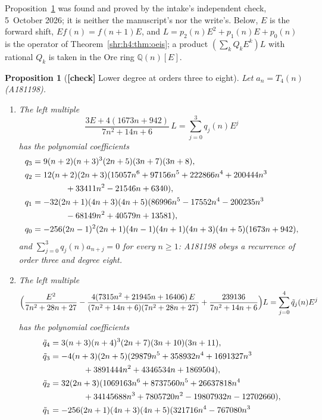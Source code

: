\documentclass[11pt,letterpaper]{article}
\numberwithin{equation}{section}
\newtheorem{proposition}[theorem]{Proposition}
\theoremstyle{definition}
\newcommand{\Q}{\mathbb Q}
\newcommand{\1}{\mathbf 1}
\begin{document}
Proposition~\ref{shr:h4:prop:higher} was found and proved by the intake's
independent check, 5~October 2026; it is neither the manuscript's nor the
write's. Below, $E$ is the forward shift, $Ef(n)=f(n+1)E$, and
$L=p_2(n)E^2+p_1(n)E+p_0(n)$ is the operator of
Theorem~\ref{shr:h4:thm:oeis}; a product $(\sum_kQ_kE^k)L$ with rational
$Q_k$ is taken in the Ore ring $\Q(n)[E]$.

\begin{proposition}[\textbf{[check]} Lower degree at orders three to eight]
\label{shr:h4:prop:higher}
Let $a_n=T_4(n)$ (A181198).
\begin{enumerate}[label=(\alph*),leftmargin=*]
\item The left multiple
\[
 \frac{3E+4(1673n+942)}{7n^2+14n+6}\,L=\sum_{j=0}^{3}q_j(n)E^j
\]
has the polynomial coefficients
\begin{align*}
 q_3&=9(n+2)(n+3)^3(2n+5)(3n+7)(3n+8),\\
 q_2&=12(n+2)(2n+3)(15057n^6+97156n^5+222866n^4+200444n^3\\
    &\hspace{14mm}+33411n^2-21546n+6340),\\
 q_1&=-32(2n+1)(4n+3)(4n+5)(86996n^5-17552n^4-200235n^3\\
    &\hspace{14mm}-68149n^2+40579n+13581),\\
 q_0&=-256(2n-1)^2(2n+1)(4n-1)(4n+1)(4n+3)(4n+5)(1673n+942),
\end{align*}
and $\sum_{j=0}^3q_j(n)a_{n+j}=0$ for every $n\ge1$: A181198 obeys a
recurrence of order three and degree eight.
\item The left multiple
\[
 \Bigl(\frac{E^2}{7n^2+28n+27}
 -\frac{4(7315n^2+21945n+16406)\,E}{(7n^2+14n+6)(7n^2+28n+27)}
 +\frac{239136}{7n^2+14n+6}\Bigr)L=\sum_{j=0}^{4}\tilde q_j(n)E^j
\]
has the polynomial coefficients
\begin{align*}
 \tilde q_4&=3(n+3)(n+4)^3(2n+7)(3n+10)(3n+11),\\
 \tilde q_3&=-4(n+3)(2n+5)(29879n^5+358932n^4+1691327n^3\\
    &\hspace{14mm}+3891444n^2+4346534n+1869504),\\
 \tilde q_2&=32(2n+3)(1069163n^6+8737560n^5+26637818n^4\\
    &\hspace{14mm}+34145688n^3+7805720n^2-19807932n-12702660),\\
 \tilde q_1&=-256(2n+1)(4n+3)(4n+5)(321716n^4-767080n^3\\

\end{align*}
\end{enumerate}
\end{proposition}
\end{document}
